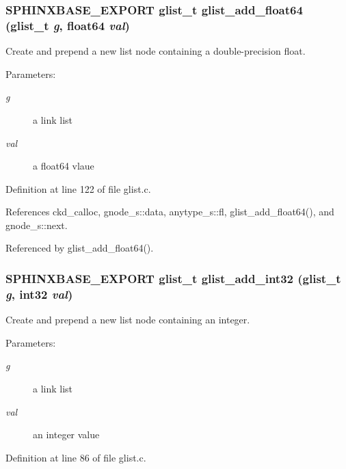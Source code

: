 \subsubsection[{glist\_\-add\_\-float64}]{\setlength{\rightskip}{0pt plus 5cm}SPHINXBASE\_\-EXPORT {\bf glist\_\-t} glist\_\-add\_\-float64 ({\bf glist\_\-t} {\em g}, \/  float64 {\em val})}\label{glist_8h_5bdd11639ef5846abb7ceb6caf059f4e}


Create and prepend a new list node containing a double-precision float. 

\begin{Desc}
\item[Parameters: ]\par
\begin{description}
\item[{\em 
g}]a link list \item[{\em 
val}]a float64 vlaue \end{description}
\end{Desc}


Definition at line 122 of file glist.c.

References ckd\_\-calloc, gnode\_\-s::data, anytype\_\-s::fl, glist\_\-add\_\-float64(), and gnode\_\-s::next.

Referenced by glist\_\-add\_\-float64().
\subsubsection[{glist\_\-add\_\-int32}]{\setlength{\rightskip}{0pt plus 5cm}SPHINXBASE\_\-EXPORT {\bf glist\_\-t} glist\_\-add\_\-int32 ({\bf glist\_\-t} {\em g}, \/  int32 {\em val})}\label{glist_8h_28adfcc24a784aaed1a0b3c4c4de4c42}


Create and prepend a new list node containing an integer. 

\begin{Desc}
\item[Parameters: ]\par
\begin{description}
\item[{\em 
g}]a link list \item[{\em 
val}]an integer value \end{description}
\end{Desc}


Definition at line 86 of file glist.c.

